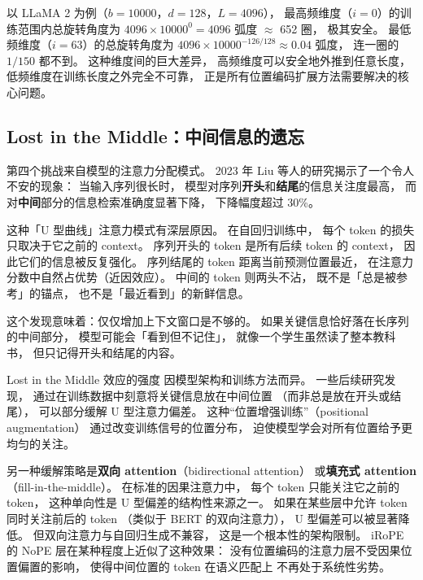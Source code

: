 以 LLaMA 2 为例（$b = 10000$，$d = 128$，$L = 4096$），
最高频维度（$i = 0$）的训练范围内总旋转角度为
$4096 \times 10000^0 = 4096$ 弧度 $\approx$ 652 圈，
极其安全。
最低频维度（$i = 63$）的总旋转角度为
$4096 \times 10000^{-126/128} \approx 0.04$ 弧度，
连一圈的 $1/150$ 都不到。
这种维度间的巨大差异，
高频维度可以安全地外推到任意长度，
低频维度在训练长度之外完全不可靠，
正是所有位置编码扩展方法需要解决的核心问题。

\subsection{Lost in the Middle：中间信息的遗忘}

第四个挑战来自模型的注意力分配模式。
2023 年 Liu 等人的研究揭示了一个令人不安的现象：
当输入序列很长时，
模型对序列\textbf{开头}和\textbf{结尾}的信息关注度最高，
而对\textbf{中间}部分的信息检索准确度显著下降，
下降幅度超过 30\%。


这种「U 型曲线」注意力模式有深层原因。
在自回归训练中，
每个 token 的损失只取决于它之前的 context。
序列开头的 token 是所有后续 token 的 context，
因此它们的信息被反复强化。
序列结尾的 token 距离当前预测位置最近，
在注意力分数中自然占优势（近因效应）。
中间的 token 则两头不沾，
既不是「总是被参考」的锚点，
也不是「最近看到」的新鲜信息。

这个发现意味着：仅仅增加上下文窗口是不够的。
如果关键信息恰好落在长序列的中间部分，
模型可能会「看到但不记住」，
就像一个学生虽然读了整本教科书，
但只记得开头和结尾的内容。

Lost in the Middle 效应的强度
因模型架构和训练方法而异。
一些后续研究发现，
通过在训练数据中刻意将关键信息放在中间位置
（而非总是放在开头或结尾），
可以部分缓解 U 型注意力偏差。
这种“位置增强训练”（positional augmentation）
通过改变训练信号的位置分布，
迫使模型学会对所有位置给予更均匀的关注。

另一种缓解策略是\textbf{双向 attention}（bidirectional attention）
或\textbf{填充式 attention}（fill-in-the-middle）。
在标准的因果注意力中，
每个 token 只能关注它之前的 token，
这种单向性是 U 型偏差的结构性来源之一。
如果在某些层中允许 token 同时关注前后的 token
（类似于 BERT 的双向注意力），
U 型偏差可以被显著降低。
但双向注意力与自回归生成不兼容，
这是一个根本性的架构限制。
iRoPE 的 NoPE 层在某种程度上近似了这种效果：
没有位置编码的注意力层不受因果位置偏置的影响，
使得中间位置的 token 在语义匹配上
不再处于系统性劣势。

